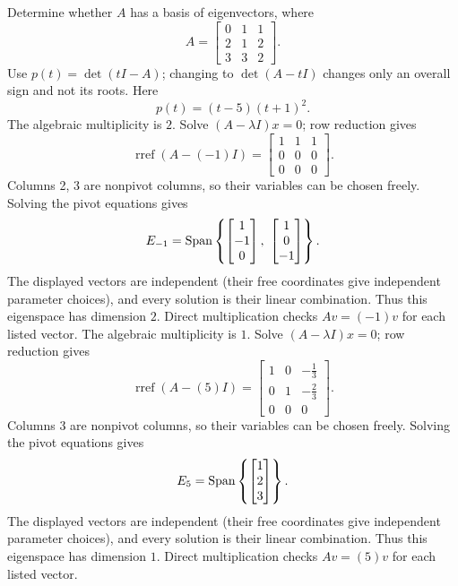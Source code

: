 \goal Determine whether $A$ has a basis of eigenvectors, where
\[A=\begin{bmatrix}0&1&1\\2&1&2\\3&3&2\end{bmatrix}.\]
Use $p(t)=\det(tI-A)$; changing to $\det(A-tI)$ changes only an overall sign and not its roots. Here
\[p(t)=\left(t - 5\right) \left(t + 1\right)^{2}.\]
The algebraic multiplicity is $2$. Solve $(A-\lambda I)x=0$; row reduction gives
\[\operatorname{rref}(A-(-1)I)=\begin{bmatrix}1&1&1\\0&0&0\\0&0&0\end{bmatrix}.\]
Columns 2, 3 are nonpivot columns, so their variables can be chosen freely. Solving the pivot equations gives
\[E_{-1}=\Span\left\{\begin{bmatrix}1\\-1\\0\end{bmatrix},\ \begin{bmatrix}1\\0\\-1\end{bmatrix}\right\}.\]
The displayed vectors are independent (their free coordinates give independent parameter choices), and every solution is their linear combination. Thus this eigenspace has dimension $2$. Direct multiplication checks $Av=(-1)v$ for each listed vector.
The algebraic multiplicity is $1$. Solve $(A-\lambda I)x=0$; row reduction gives
\[\operatorname{rref}(A-(5)I)=\begin{bmatrix}1&0&- \frac{1}{3}\\0&1&- \frac{2}{3}\\0&0&0\end{bmatrix}.\]
Columns 3 are nonpivot columns, so their variables can be chosen freely. Solving the pivot equations gives
\[E_{5}=\operatorname{Span}\left\{\begin{bmatrix}1\\2\\3\end{bmatrix}\right\}.\]
The displayed vectors are independent (their free coordinates give independent parameter choices), and every solution is their linear combination. Thus this eigenspace has dimension $1$. Direct multiplication checks $Av=(5)v$ for each listed vector.
